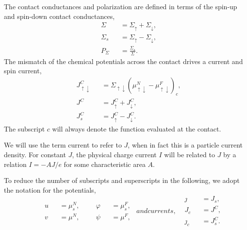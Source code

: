 The contact conductances and polarization are defined in terms
of the spin-up and spin-down contact conductances,
\begin{subequations}\label{eq:contact_conductances}
  \begin{alignat}{2}
    & Σ   && = Σ_↑ + Σ_↓, \\
    & Σ_s && = Σ_↑ - Σ_↓,
    \\
    \label{eq:contact.polarization}
    & P_Σ && = \frac{Σ_s}{Σ}.
  \end{alignat}
\end{subequations}
The mismatch of the chemical potentials across the contact
drives a current and spin current,
\begin{subequations}\label{eq:contact_currents}
  \begin{alignat}{2}
    & J_{↑↓}^C && = Σ_{↑↓} {\left( μ^N_{↑↓} - μ^F_{↑↓} \right)}_c, \\
    & J^C      && = J_↑^C + J_↓^C, \\
    & J_s^C    && = J_↑^C - J_↓^C.
  \end{alignat}
\end{subequations}
The subscript $c$ will always denote the function evaluated at the contact.

We will use the term current to refer to $J$,
when in fact this is a particle current density.
For constant $J$, the physical charge current $I$ will be related to $J$
by a relation $I = - A J / e$ for some characteristic area $A$.

To reduce the number of subscripts and superscripts in the following,
we adopt the notation for the potentials,
\begin{subequations}
  \begin{equation}
    \begin{aligned}
    & \begin{alignedat}{2}
        & u && = μ^N_s, \\
        & v && = μ^N,
      \end{alignedat}
    & \begin{alignedat}{2}
        & φ && = μ^F_s, \\
        & ψ && = μ^F,
      \end{alignedat}
    \end{aligned}
  \end{equation}
  and currents,
  \begin{equation}
    \begin{alignedat}{2}
      & ȷ   && = J_s, \\
      & J_c && = J^C, \\
      & ȷ_c && = J_s^C.
    \end{alignedat}
  \end{equation}
\end{subequations}

